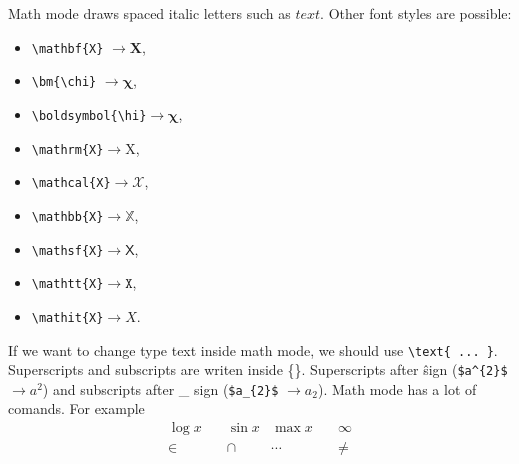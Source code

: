 \documentclass{article}
\begin{document}
Math mode draws spaced italic letters such as $text$. Other font styles are possible:
\begin{itemize}
    \item  \verb|\mathbf{X}| $\rightarrow \mathbf{X}$,
    \item  \verb|\bm{\chi}| $\rightarrow \bm{\chi}$,
    \item  \verb|\boldsymbol{\hi}|$ \rightarrow \boldsymbol{\chi}$,
    \item  \verb|\mathrm{X}|$ \rightarrow \mathrm{X}$,
    \item  \verb|\mathcal{X}|$ \rightarrow \mathcal{X}$,
    \item  \verb|\mathbb{X}|$ \rightarrow \mathbb{X}$,
    \item  \verb|\mathsf{X}|$ \rightarrow \mathsf{X}$,
    \item  \verb|\mathtt{X}|$ \rightarrow \mathtt{X}$,
    \item  \verb|\mathit{X}|$ \rightarrow \mathit{X}$.
\end{itemize}
If we want to change type text inside math mode, we should use \verb|\text{ ... }|.  Superscripts and subscripts are writen inside \{\}.  Superscripts after \^ sign (\verb|$a^{2}$| $\rightarrow a^{2}$) and subscripts after \_ sign (\verb|$a_{2}$| $\rightarrow a_{2}$). Math mode has a lot of comands. For example
\begin{align*}
    \log x & \quad \sin x & \max x & \quad \infty \\
    \in & \quad \cap & \cdots & \quad \neq
\end{align*}
\end{document}
